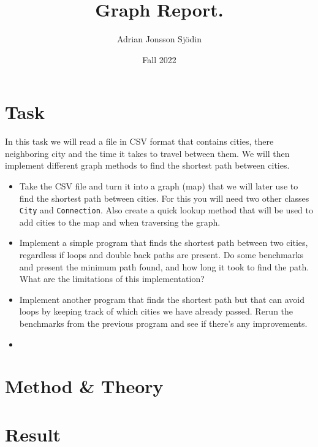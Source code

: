 \documentclass[a4paper,11pt]{article}
\begin{document}
\title{
    \textbf{Graph Report.}
}
\author{Adrian Jonsson Sjödin}
\date{Fall 2022}

\maketitle

\section{Task}
\label{task}
In this task we will read a file in CSV format that contains cities, there neighboring city and the time it takes to travel
between them. We will then implement different graph methods to find the shortest path between cities.
\begin{itemize}
    \item Take the CSV file and turn it into a graph (map) that we will later use to find the shortest path between cities. For this you will
          need two other classes {\tt City} and {\tt Connection}. Also create a quick lookup method that will be used to add cities
          to the map and when traversing the graph.

    \item Implement a simple program that finds the shortest path between two cities, regardless if loops and double back paths
          are present. Do some benchmarks and present the minimum path found, and how long it took to find the path. What are the
          limitations of this implementation?

    \item Implement another program that finds the shortest path but that can avoid loops by keeping track of which cities we have
          already passed. Rerun the benchmarks from the previous program and see if there's any improvements.

    \item

\end{itemize}

\section{Method \& Theory}
\label{method}


\section{Result}
\end{document}
